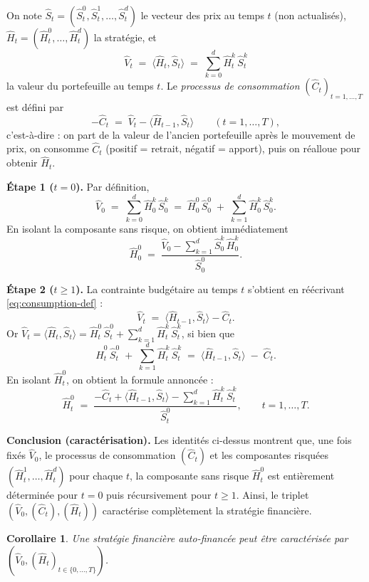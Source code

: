 \documentclass[12pt,a4paper]{article}
\makeatletter
\numberwithin{equation}{section}
\theoremstyle{plain} %
\newtheorem{corollaire}{Corollaire}
\theoremstyle{definition} %
\theoremstyle{remark} %
\theoremstyle{myexample}
\theoremstyle{definition}
\renewenvironment{proof}[1][\proofname]{%
  \par\vspace{0.8em}%
  \pushQED{\qed}%
  \normalfont\color{cyan}%
  \topsep6\p@\@plus6\p@\relax
  \trivlist
  \item[\hskip\labelsep\bfseries\color{cyan}#1\@addpunct{.}]\ignorespaces
}{%
  \popQED\endtrivlist\vspace{0.8em}%
}
\makeatother
\begin{document}
\begin{proof}[Preuve]
On note $\hat S_t=(\hat S_t^0,\hat S_t^1,\ldots,\hat S_t^d)$ le vecteur des prix au temps $t$ (non actualisés),
$\hat H_t=(\hat H_t^0,\ldots,\hat H_t^d)$ la stratégie, et
\[
\hat V_t \;=\; \langle \hat H_t,\hat S_t\rangle \;=\; \sum_{k=0}^d \hat H_t^k\,\hat S_t^k
\]
la valeur du portefeuille au temps $t$.
Le \emph{processus de consommation} $(\hat C_t)_{t=1,\ldots,T}$ est défini par
\begin{equation}\label{eq:consumption-def}
-\hat C_t \;=\; \hat V_t - \langle \hat H_{t-1}, \hat S_t\rangle
\qquad (t=1,\ldots,T),
\end{equation}
c’est-à-dire : on part de la valeur de l’ancien portefeuille après le mouvement de prix,
on consomme $\hat C_t$ (positif = retrait, négatif = apport), puis on réalloue pour obtenir $\hat H_t$.

\smallskip
\noindent\textbf{Étape 1 ($t=0$).}
Par définition,
\[
\hat V_0 \;=\; \sum_{k=0}^d \hat H_0^k\,\hat S_0^k
\;=\; \hat H_0^0\,\hat S_0^0 \;+\; \sum_{k=1}^d \hat H_0^k\,\hat S_0^k.
\]
En isolant la composante sans risque, on obtient immédiatement
\[
\hat H_0^0 \;=\; \frac{\hat V_0 - \sum_{k=1}^d \hat S_0^k\,\hat H_0^k}{\hat S_0^0}.
\]

\smallskip
\noindent\textbf{Étape 2 ($t\ge 1$).}
La contrainte budgétaire au temps $t$ s’obtient en réécrivant \eqref{eq:consumption-def} :
\[
\hat V_t \;=\; \langle \hat H_{t-1}, \hat S_t\rangle - \hat C_t.
\]
Or $\hat V_t=\langle \hat H_t,\hat S_t\rangle = \hat H_t^0\,\hat S_t^0 + \sum_{k=1}^d \hat H_t^k\,\hat S_t^k$,
si bien que
\[
\hat H_t^0\,\hat S_t^0 \;+\; \sum_{k=1}^d \hat H_t^k\,\hat S_t^k
\;=\; \langle \hat H_{t-1}, \hat S_t\rangle \;-\; \hat C_t.
\]
En isolant $\hat H_t^0$, on obtient la formule annoncée :
\[
\hat H_t^0 \;=\; \frac{-\hat C_t + \langle \hat H_{t-1}, \hat S_t\rangle - \sum_{k=1}^d \hat H_t^k\,\hat S_t^k}{\hat S_t^0},
\qquad t=1,\ldots,T.
\]

\smallskip
\noindent\textbf{Conclusion (caractérisation).}
Les identités ci-dessus montrent que, une fois fixés
$\hat V_0$, le processus de consommation $(\hat C_t)$ et les composantes risquées
$(\hat H_t^1,\ldots,\hat H_t^d)$ pour chaque $t$, la composante sans risque $\hat H_t^0$
est entièrement déterminée pour $t=0$ puis récursivement pour $t\ge 1$.
Ainsi, le triplet $(\hat V_0,(\hat C_t),(\hat H_t))$ caractérise complètement la stratégie financière.
\end{proof}

\begin{corollaire}
Une stratégie financière auto-financée peut être caractérisée par $(\hat V_0, (\hat H_t)_{t\in\{0,\ldots,T\}})$.
\end{corollaire}
\end{document}
